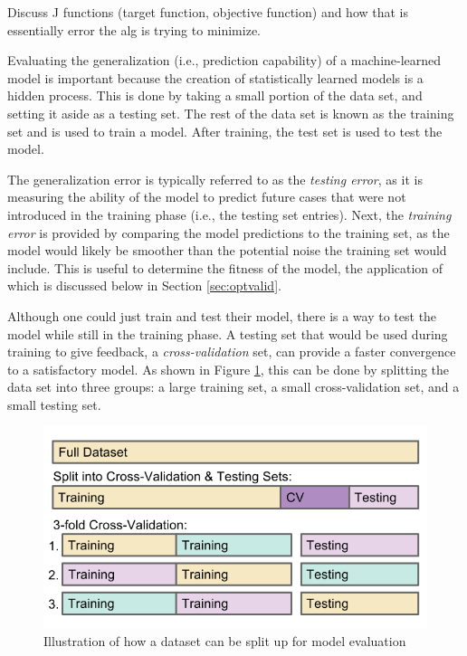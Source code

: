 Discuss J functions (target function, objective function) and
how that is essentially error the alg is trying to minimize. 

Evaluating the generalization (i.e., prediction capability) of a
machine-learned model is important because the creation of statistically
learned models is a hidden process. This is done by taking a small portion of
the data set, and setting it aside as a testing set.  The rest of the data set
is known as the training set and is used to train a model. After training, the
test set is used to test the model.  

The generalization error is typically referred to as the \textit{testing
error}, as it is measuring the ability of the model to predict future cases
that were not introduced in the training phase (i.e., the testing set entries).
Next, the \textit{training error} is provided by comparing the model
predictions to the training set, as the model would likely be smoother than the
potential noise the training set would include. This is useful to determine the
fitness of the model, the application of which is discussed below in Section
\ref{sec:optvalid}.

Although one could just train and test their model, there is a way to test the
model while still in the training phase. A testing set that would be used
during training to give feedback, a \textit{cross-validation} set, can provide
a faster convergence to a satisfactory model. As shown in Figure
\ref{fig:cverror}, this can be done by splitting the data set into three
groups: a large training set, a small cross-validation set, and a small testing
set. 

\begin{figure}[!htb]
  \includegraphics[width=\linewidth]{./chapters/litrev/cverror.png}
  \caption{Illustration of how a dataset can be split up for model evaluation}
  \label{fig:cverror}
\end{figure}

